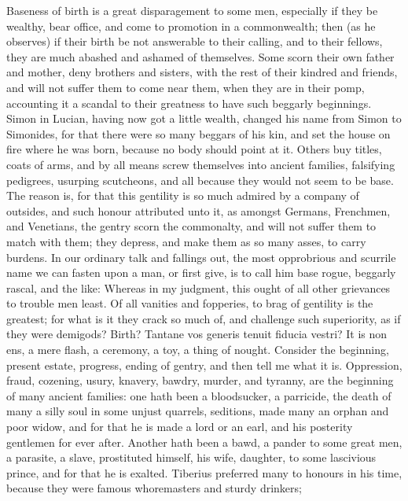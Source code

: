 {Baseness of birth is a great disparagement to some men, especially if
they be wealthy, bear office, and come to promotion in a commonwealth;
then (as he observes) if their birth be not answerable to their
calling, and to their fellows, they are much abashed and ashamed of
themselves. Some scorn their own father and mother, deny brothers and
sisters, with the rest of their kindred and friends, and will not
suffer them to come near them, when they are in their pomp, accounting
it a scandal to their greatness to have such beggarly beginnings. Simon
in Lucian, having now got a little wealth, changed his name from Simon
to Simonides, for that there were so many beggars of his kin, and set
the house on fire where he was born, because no body should point at
it. Others buy titles, coats of arms, and by all means screw themselves
into ancient families, falsifying pedigrees, usurping scutcheons, and
all because they would not seem to be base. The reason is, for that
this gentility is so much admired by a company of outsides, and such
honour attributed unto it, as amongst Germans, Frenchmen, and
Venetians, the gentry scorn the commonalty, and will not suffer them to
match with them; they depress, and make them as so many asses, to carry
burdens. In our ordinary talk and fallings out, the most opprobrious
and scurrile name we can fasten upon a man, or first give, is to call
him base rogue, beggarly rascal, and the like: Whereas in my judgment,
this ought of all other grievances to trouble men least. Of all
vanities and fopperies, to brag of gentility is the greatest; for what
is it they crack so much of, and challenge such superiority, as if they
were demigods? Birth? Tantane vos generis tenuit fiducia vestri?
It is non ens, a mere flash, a ceremony, a toy, a thing of
nought. Consider the beginning, present estate, progress, ending of
gentry, and then tell me what it is. Oppression, fraud, cozening,
usury, knavery, bawdry, murder, and tyranny, are the beginning of many
ancient families: one hath been a bloodsucker, a parricide, the
death of many a silly soul in some unjust quarrels, seditions, made
many an orphan and poor widow, and for that he is made a lord or an
earl, and his posterity gentlemen for ever after. Another hath been a
bawd, a pander to some great men, a parasite, a slave,
prostituted himself, his wife, daughter, to some lascivious
prince, and for that he is exalted. Tiberius preferred many to honours
in his time, because they were famous whoremasters and sturdy drinkers;
}
